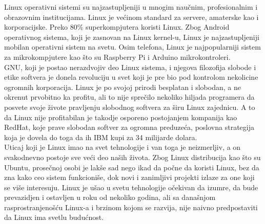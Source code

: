 Linux operativni sistemi su najzastupljeniji u mnogim naučnim, profesionalnim i obrazovnim institucijama. Linux je većinom standard za servere, amaterske kao i korporacijske. Preko 80\% superkompjutera koristi Linux. Zbog Android operativnog sistema, koji je zasnovan na Linux kernel-u, Linux je najzastupljeniji mobilan operativni sistem na svetu. Osim telefona, Linux je najpopularniji sistem za mikrokompjutere kao što su Raspberry Pi i Arduino mikrokontroleri.\\
GNU, koji je postao nerazdvojiv deo Linux sistema, i njegova filozofija slobode i etike softvera je donela revoluciju u svet koji je pre bio pod kontrolom nekolicine ogromnih korporacija. Linux je po svojoj prirodi besplatan i slobodan, a ne okrenut prvobitno ka profitu, ali to nije sprečilo nekoliko hiljada programera da posvete svoje živote pravljenju slobodnog softvera za širu Linux zajednicu. A to da Linux nije profitabilan je takodje osporeno postojanjem kompanija kao RedHat, koje prave slobodan softver za ogromna preduzeća, poslovna strategija koja je dovela do toga da ih IBM kupi za 34 milijarde dolara.\\
Uticaj koji je Linux imao na svet tehnologije i van toga je neizmerljiv, a on svakodnevno postoje sve veći deo naših života. Zbog Linux distribucija kao što su Ubuntu, prosečnoj osobi je lakše sad nego ikad da počne da koristi Linux, bez da zna kako ceo sistem funkcioniše, dok novi i zanimljivi projekti izlaze za one koji se više interesuju. Linux je ušao u svetu tehnologije očekivan da izumre, da bude prevazidjen i ostavljen u roku od nekoliko godina, ali sa današnjom rasprostranjenošću Linux-a i brzinom kojom se razvija, nije naivno predpostaviti da Linux ima svetlu budućnost.